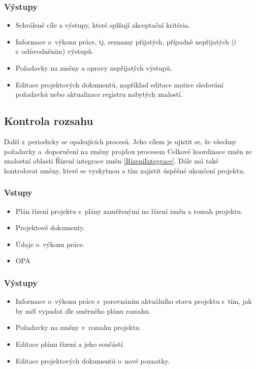 \subsubsection*{Výstupy}
\begin{itemize}
    \item Schválené cíle a výstupy, které splňují akceptační kritéria. 
    \item Informace o~výkonu práce, tj.  seznamy přijatých, případně nepřijatých (i s~odůvodněním) výstupů.
    \item Požadavky na změny a opravy nepřijatých výstupů.
    \item Editace projektových dokumentů, například editace matice sledování požadavků nebo aktualizace registru nabytých znalostí. 
\end{itemize}

\subsection*{Kontrola rozsahu}

Další z~periodicky se opakujících procesů. Jeho cílem je ujistit se, že všechny požadavky a~doporučení na změny projdou procesem Celkové koordinace změn ze znalostní oblasti Řízení integrace změn \ref{RizeniIntegrace}. Dále má také kontrolovat změny, které se vyskytnou a tím zajistit úspěšné ukončení projektu.

\subsubsection*{Vstupy}
\begin{itemize}
    \item Plán řízení projektu s~plány zaměřenými na řízení změn a rozsah projektu.
    \item Projektové dokumenty.
    \item Údaje o~výkonu práce.
    \item OPA
\end{itemize}
\subsubsection*{Výstupy}
\begin{itemize}
    \item Informace o~výkonu práce s~porovnáním aktuálního stavu projektu s~tím, jak by měl vypadat dle směrného plánu rozsahu. 
    \item Požadavky na změny v~rozsahu projektu.
    \item Editace plánu řízení a jeho součástí.
    \item Editace projektových dokumentů o~nové poznatky. 
\end{itemize}



